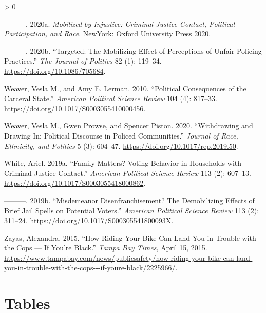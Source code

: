\documentclass[
  12pt,
]{article}
\newlength{\cslhangindent}
\newenvironment{CSLReferences}[2] %
 {%
  \setlength{\parindent}{0pt}
  \ifodd #1 \everypar{\setlength{\hangindent}{\cslhangindent}}\ignorespaces\fi
  \ifnum #2 > 0
  \setlength{\parskip}{#2\baselineskip}
  \fi
 }%
 {}
\begin{document}
\begin{CSLReferences}{1}{0}
\leavevmode\hypertarget{ref-Walker2020a}{}%
---------. 2020a. \emph{Mobilized by Injustice: Criminal Justice Contact, Political Participation, and Race}. {NewYork}: {Oxford University Press 2020}.

\leavevmode\hypertarget{ref-Walker2020}{}%
---------. 2020b. {``Targeted: {The Mobilizing Effect} of {Perceptions} of {Unfair Policing Practices}.''} \emph{The Journal of Politics} 82 (1): 119--34. \url{https://doi.org/10.1086/705684}.

\leavevmode\hypertarget{ref-Weaver2010}{}%
Weaver, Vesla M., and Amy E. Lerman. 2010. {``Political {Consequences} of the {Carceral State}.''} \emph{American Political Science Review} 104 (4): 817--33. \url{https://doi.org/10.1017/S0003055410000456}.

\leavevmode\hypertarget{ref-Weaver2020}{}%
Weaver, Vesla M., Gwen Prowse, and Spencer Piston. 2020. {``Withdrawing and {Drawing In}: {Political Discourse} in {Policed Communities}.''} \emph{Journal of Race, Ethnicity, and Politics} 5 (3): 604--47. \url{https://doi.org/10.1017/rep.2019.50}.

\leavevmode\hypertarget{ref-White2019}{}%
White, Ariel. 2019a. {``Family {Matters}? {Voting Behavior} in {Households} with {Criminal Justice Contact}.''} \emph{American Political Science Review} 113 (2): 607--13. \url{https://doi.org/10.1017/S0003055418000862}.

\leavevmode\hypertarget{ref-White2019a}{}%
---------. 2019b. {``Misdemeanor {Disenfranchisement}? {The Demobilizing Effects} of {Brief Jail Spells} on {Potential Voters}.''} \emph{American Political Science Review} 113 (2): 311--24. \url{https://doi.org/10.1017/S000305541800093X}.

\leavevmode\hypertarget{ref-Zayas2015}{}%
Zayas, Alexandra. 2015. {``How Riding Your Bike Can Land You in Trouble with the Cops --- If You're Black.''} \emph{Tampa Bay Times}, April 15, 2015. \url{https://www.tampabay.com/news/publicsafety/how-riding-your-bike-can-land-you-in-trouble-with-the-cops---if-youre-black/2225966/}.

\end{CSLReferences}

\newpage

\hypertarget{tables}{%
\section*{Tables}\label{tables}}

\begin{singlespace}

\end{singlespace}
\end{document}
